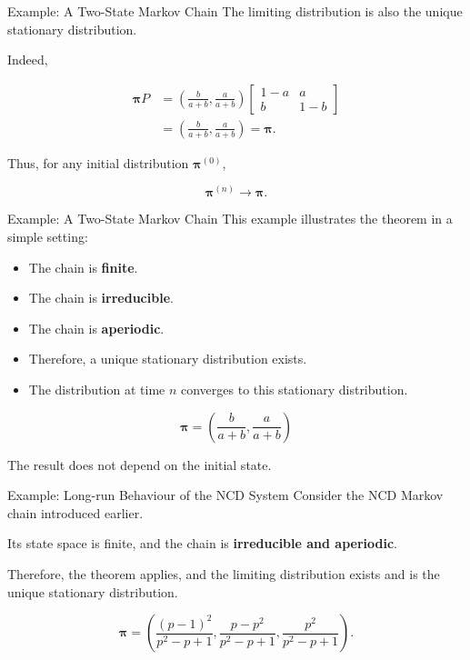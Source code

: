 \documentclass[
  ignorenonframetext,
  aspectratio=169,
]{beamer}
\providecommand{\tightlist}{%
  \setlength{\itemsep}{0pt}\setlength{\parskip}{0pt}}
\begin{document}
\begin{frame}{Example: A Two-State Markov Chain}
\protect{}\label{example-a-two-state-markov-chain-2}
The limiting distribution is also the unique stationary distribution.

Indeed,

\[
\begin{aligned}
\boldsymbol{\pi}P
&=
\left(
\frac{b}{a+b},
\frac{a}{a+b}
\right)
\begin{bmatrix}
1-a&a\\
b&1-b
\end{bmatrix}\\
&=
\left(
\frac{b}{a+b},
\frac{a}{a+b}
\right)
=\boldsymbol{\pi}.
\end{aligned}
\]

Thus, for any initial distribution \(\boldsymbol{\pi}^{(0)}\),

\[
\boldsymbol{\pi}^{(n)}
\longrightarrow
\boldsymbol{\pi}.
\]
\end{frame}

\begin{frame}{Example: A Two-State Markov Chain}
\protect{}\label{example-a-two-state-markov-chain-3}
This example illustrates the theorem in a simple setting:

\begin{itemize}
\tightlist
\item
  The chain is \textbf{finite}.
\item
  The chain is \textbf{irreducible}.
\item
  The chain is \textbf{aperiodic}.
\item
  Therefore, a unique stationary distribution exists.
\item
  The distribution at time \(n\) converges to this stationary
  distribution.
\end{itemize}

\[
\boxed{
\boldsymbol{\pi}
=
\left(
\frac{b}{a+b},
\frac{a}{a+b}
\right)
}
\]

The result does not depend on the initial state.
\end{frame}

\begin{frame}{Example: Long-run Behaviour of the NCD System}
\protect{}\label{example-long-run-behaviour-of-the-ncd-system}
Consider the NCD Markov chain introduced earlier.

Its state space is finite, and the chain is \textbf{irreducible and
aperiodic}.

Therefore, the theorem applies, and the limiting distribution exists and
is the unique stationary distribution.

\[
\boldsymbol{\pi}
=
\left(
\frac{(p-1)^2}{p^2-p+1},
\frac{p-p^2}{p^2-p+1},
\frac{p^2}{p^2-p+1}
\right).
\]
\end{frame}
\end{document}
